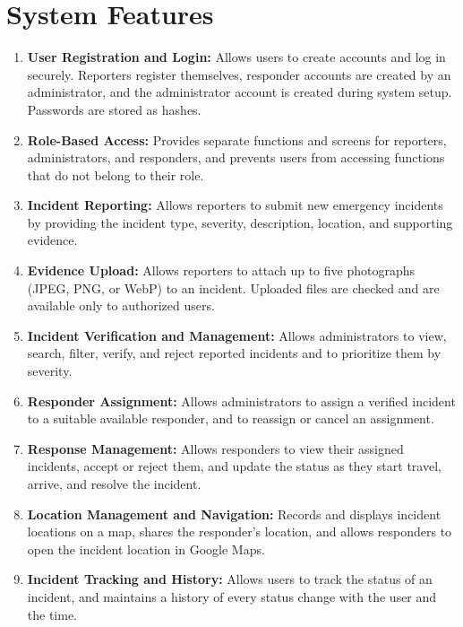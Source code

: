 \documentclass[a4paper,12pt]{report}
\begin{document}
	\section{System Features}
	\begin{enumerate}
		
		\item \textbf{User Registration and Login:}
		Allows users to create accounts and log in securely. Reporters register themselves, responder accounts are created by an administrator, and the administrator account is created during system setup. Passwords are stored as hashes.
		
		\item \textbf{Role-Based Access:}
		Provides separate functions and screens for reporters, administrators, and responders, and prevents users from accessing functions that do not belong to their role.
		
		\item \textbf{Incident Reporting:}
		Allows reporters to submit new emergency incidents by providing the incident type, severity, description, location, and supporting evidence.
		
		\item \textbf{Evidence Upload:}
		Allows reporters to attach up to five photographs (JPEG, PNG, or WebP) to an incident. Uploaded files are checked and are available only to authorized users.
		
		\item \textbf{Incident Verification and Management:}
		Allows administrators to view, search, filter, verify, and reject reported incidents and to prioritize them by severity.
		
		\item \textbf{Responder Assignment:}
		Allows administrators to assign a verified incident to a suitable available responder, and to reassign or cancel an assignment.
		
		\item \textbf{Response Management:}
		Allows responders to view their assigned incidents, accept or reject them, and update the status as they start travel, arrive, and resolve the incident.
		
		\item \textbf{Location Management and Navigation:}
		Records and displays incident locations on a map, shares the responder's location, and allows responders to open the incident location in Google Maps.
		
		\item \textbf{Incident Tracking and History:}
		Allows users to track the status of an incident, and maintains a history of every status change with the user and the time.
		

\end{enumerate}
\end{document}
